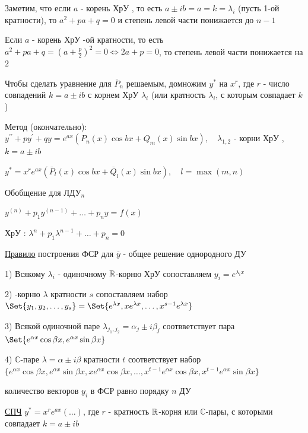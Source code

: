 \documentclass[12pt]{article}
\begin{document}
    Заметим, что если $a$ - корень ХрУ \Cat, то есть $a \pm ib = a = k = \lambda_i$ (пусть 1-ой кратности), то $a^2 + pa + q = 0$ и степень
    левой части понижается до $n - 1$

    Если $a$ - корень ХрУ -ой кратности, то есть $a^2 + pa + q = \left(a + \frac{p}{2}\right)^2 = 0 \Longleftrightarrow 2a + p = 0$, то степень левой части понижается на $2$

    Чтобы сделать уравнение для $\overline{P}_n$ решаемым, домножим $y^*$ на $x^r$, где $r$ - число совпадений $k = a \pm ib$ с корнем ХрУ $\lambda_i$ (или кратность $\lambda_i$, с которым совпадает $k$)

    \vspace{5mm}
    Метод (окончательно): $y^{\prime\prime} + py^\prime + qy = e^{ax} (P_n(x)\cos bx + Q_m (x)\sin bx), \quad \lambda_{1,2}$ - корни ХрУ \Cat, $k = a \pm ib$

    $y^* = x^r e^{ax} (\overline{P}_l (x)\cos bx + \overline{Q}_l (x) \sin bx), \quad l = \max(m, n)$

    \vspace{5mm}
    Обобщение для ЛДУ$_n$

    $y^{(n)} + p_1 y^{(n - 1)} + \dots + p_n y = f(x)$

    ХрУ \Cat: $\lambda^n + p_1 \lambda^{n - 1} + \dots + p_n = 0$

    \vspace{5mm}
    \underline{Правило} построения ФСР для $\overline{y}$ - общее решение однородного ДУ

    1) Всякому $\lambda_i$ - одиночному $\mathbb{R}$-корню ХрУ сопоставляем $y_i = e^{\lambda_i x}$

    2) \Real-корню $\lambda$ кратности $s$ сопоставляем набор $\Set{y_1, y_2, \dots, y_s} = \Set{e^{\lambda x}, xe^{\lambda x}, \dots, x^{s - 1} e^{\lambda x}}$

    3) Всякой одиночной паре $\lambda_{j_1,j_2} = \alpha_j \pm i\beta_j$ соотвветствует пара $\Set{e^{\alpha x} \cos\beta x, e^{\alpha x} \sin\beta x}$

    4) $\mathbb{C}$-паре $\lambda = \alpha \pm i\beta$ кратности $t$ соответствует набор $\{e^{\alpha x} \cos \beta x, e^{\alpha x} \sin \beta x, x e^{\alpha x} \cos \beta x, \dots, x^{t - 1}e^{\alpha x} \cos\beta x, x^{t - 1}e^{\alpha x} \sin\beta x\}$

    \Nota количество векторов $y_i$ в ФСР равно порядку $n$ ДУ

    \underline{СПЧ} $y^* = x^r e^{ax} (\dots)$, где $r$ - кратность $\mathbb{R}$-корня или $\mathbb{C}$-пары, с которыми совпадает $k = a \pm ib$
\end{document}
